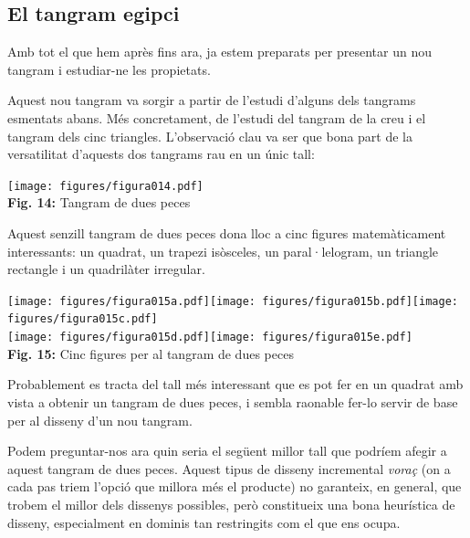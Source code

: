 \documentclass[a4paper,11pt]{article}
\begin{document}
\begin{multicols}{2}

        \section{El tangram egipci}

            Amb tot el que hem après fins ara, ja estem preparats per presentar un nou tangram i estudiar-ne les propietats.

            Aquest nou tangram va sorgir a partir de l'estudi d'alguns dels tangrams esmentats abans. Més concretament, de l'estudi del tangram de la creu i el tangram dels cinc triangles. L'observació clau va ser que bona part de la versatilitat d'aquests dos tangrams rau en un únic tall:

            \begin{center}
                \texttt{[image: figures/figura014.pdf]} \\
                \footnotesize{\textbf{Fig. 14:} Tangram de dues peces}
            \end{center}

            Aquest senzill tangram de dues peces dona lloc a cinc figures matemàticament interessants: un quadrat, un trapezi isòsceles, un paral·lelogram, un triangle rectangle i un quadrilàter irregular.

            \begin{center}
                \texttt{[image: figures/figura015a.pdf]}\quad\texttt{[image: figures/figura015b.pdf]}\quad\texttt{[image: figures/figura015c.pdf]} \\ \medskip
                \texttt{[image: figures/figura015d.pdf]}\quad\texttt{[image: figures/figura015e.pdf]} \\
                \footnotesize{\textbf{Fig. 15:} Cinc figures per al tangram de dues peces}
            \end{center}

            Probablement es tracta del tall més interessant que es pot fer en un quadrat amb vista a obtenir un tangram de dues peces, i sembla raonable fer-lo servir de base per al disseny d'un nou tangram.

            Podem preguntar-nos ara quin seria el següent millor tall que podríem afegir a aquest tangram de dues peces. Aquest tipus de disseny incremental \emph{voraç} (on a cada pas triem l'opció que millora més el producte) no garanteix, en general, que trobem el millor dels dissenys possibles, però constitueix una bona heurística de disseny, especialment en dominis tan restringits com el que ens ocupa.


\end{multicols}
\end{document}
